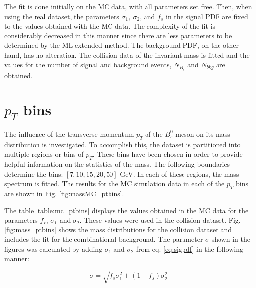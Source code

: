 The fit is done initially on the MC data, with all parameters set free. Then, when using the real dataset, the parameters $\sigma_1, \ \sigma_2$, and $f_s$ in the signal PDF are fixed to the values obtained with the MC data. The complexity of the fit is considerably decreased in this manner since there are less parameters to be determined by the ML extended method. The background PDF, on the other hand, has no alteration. The collision data of the invariant mass is fitted and the values for the number of signal and background events, $N_{B^0_s}$ and $N_{bkg}$ are obtained. 

\section{$p_T$ bins}

The influence of the transverse momentum $p_T$ of the $B_s^0$ meson on its mass distribution is investigated. To accomplish this, the dataset is partitioned into multiple regions or bins of $p_T$. These bins have been chosen in order to provide helpful information on the statistics of the mass. The following boundaries determine the bins: $[7, 10, 15, 20, 50]$ GeV. In each of these regions, the mass spectrum is fitted. The results for the MC simulation data in each of the $p_T$ bins are shown in Fig. \ref{fig:massMC_ptbins}. 

The table \ref{table:mc_ptbins} displays the values obtained in the MC data for the parameters $f_s$, $\sigma_1$ and $\sigma_2$. These values were used in the collision dataset. Fig. \ref{fig:mass_ptbins} shows the mass distributions for the collision dataset and includes the fit for the combinational background. The parameter $\sigma$ shown in the figures was calculated by adding $\sigma_1$ and $\sigma_2$ from eq. \ref{eq:sigpdf} in the following manner:

\begin{equation}
	\sigma = \sqrt{f_s \sigma_1^2 + (1-f_s)\sigma_2^2}
\end{equation}

